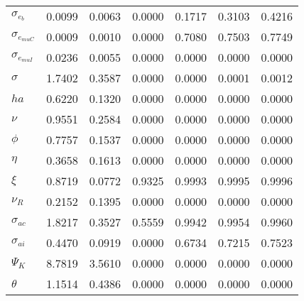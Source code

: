 \begin{center}
\begin{longtable}{lcccccc}
$ \sigma_{{e_b}}       $	 & 	          0.0099	 & 	          0.0063	 & 	          0.0000	 & 	          0.1717	 & 	          0.3103	 & 	          0.4216 \\ 
$ \sigma_{{e_{muC}}}   $	 & 	          0.0009	 & 	          0.0010	 & 	          0.0000	 & 	          0.7080	 & 	          0.7503	 & 	          0.7749 \\ 
$ \sigma_{{e_{muI}}}   $	 & 	          0.0236	 & 	          0.0055	 & 	          0.0000	 & 	          0.0000	 & 	          0.0000	 & 	          0.0000 \\ 
$ {\sigma}             $	 & 	          1.7402	 & 	          0.3587	 & 	          0.0000	 & 	          0.0000	 & 	          0.0001	 & 	          0.0012 \\ 
$ {ha}                 $	 & 	          0.6220	 & 	          0.1320	 & 	          0.0000	 & 	          0.0000	 & 	          0.0000	 & 	          0.0000 \\ 
$ \nu                  $	 & 	          0.9551	 & 	          0.2584	 & 	          0.0000	 & 	          0.0000	 & 	          0.0000	 & 	          0.0000 \\ 
$ {\phi}               $	 & 	          0.7757	 & 	          0.1537	 & 	          0.0000	 & 	          0.0000	 & 	          0.0000	 & 	          0.0000 \\ 
$ {\eta}               $	 & 	          0.3658	 & 	          0.1613	 & 	          0.0000	 & 	          0.0000	 & 	          0.0000	 & 	          0.0000 \\ 
$ \xi                  $	 & 	          0.8719	 & 	          0.0772	 & 	          0.9325	 & 	          0.9993	 & 	          0.9995	 & 	          0.9996 \\ 
$ {\nu_R}              $	 & 	          0.2152	 & 	          0.1395	 & 	          0.0000	 & 	          0.0000	 & 	          0.0000	 & 	          0.0000 \\ 
$ {\sigma_{ac}}        $	 & 	          1.8217	 & 	          0.3527	 & 	          0.5559	 & 	          0.9942	 & 	          0.9954	 & 	          0.9960 \\ 
$ {\sigma_{ai}}        $	 & 	          0.4470	 & 	          0.0919	 & 	          0.0000	 & 	          0.6734	 & 	          0.7215	 & 	          0.7523 \\ 
$ {\Psi_{K}}           $	 & 	          8.7819	 & 	          3.5610	 & 	          0.0000	 & 	          0.0000	 & 	          0.0000	 & 	          0.0000 \\ 
$ {\theta}             $	 & 	          1.1514	 & 	          0.4386	 & 	          0.0000	 & 	          0.0000	 & 	          0.0000	 & 	          0.0000 \\ 

\end{longtable}
\end{center}
